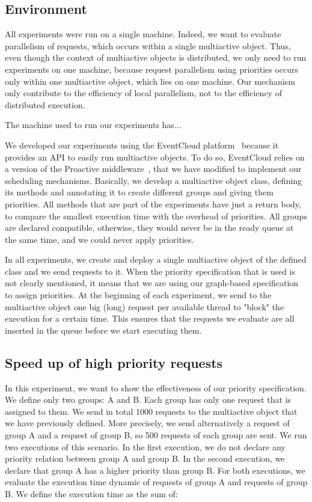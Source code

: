 \documentclass[11pt]{report}
\begin{document}
\subsection{Environment}
All experiments were run on a single machine. Indeed, we want to evaluate parallelism of requests, which occurs within a single multiactive object. Thus, even though the context of multiactive objects is distributed, we only need to run experiments on one machine, because request parallelism using priorities occurs only within one multiactive object, which lies on one machine. Our mechanism only contribute to the efficiency of local parallelism, not to the efficiency of distributed execution.

The machine used to run our experiments has...

We developed our experiments using the EventCloud platform~\citep{ref:eventcloud} because it provides an API to easily run multiactive objects. To do so, EventCloud relies on a version of the Proactive middleware~\citep{ref:proactive}, that we have modified to implement our scheduling mechanisms.
Basically, we develop a multiactive object class, defining its methods and annotating it to create different groups and giving them priorities. All methods that are part of the experiments have just a return body, to compare the smallest execution time with the overhead of priorities. All groups are declared compatible, otherwise, they would never be in the ready queue at the same time, and we could never apply priorities. 

In all experiments, we create and deploy a single multiactive object of the defined class and we send requests to it. When the priority specification that is used is not clearly mentioned, it means that we are using our graph-based specification to assign priorities. At the beginning of each experiment, we send to the multiactive object one big (long) request per available thread to "block" the execution for a certain time. This ensures that the requests we evaluate are all inserted in the queue before we start executing them.


\subsection{Speed up of high priority requests}
In this experiment, we want to show the effectiveness of our priority specification. We define only two groups: A and B. Each group has only one request that is assigned to them. We send in total 1000 requests to the multiactive object that we have previously defined. More precisely, we send alternatively a request of group A and a request of group B, so 500 requests of each group are sent. We run two executions of this scenario. In the first execution, we do not declare any priority relation between group A and group B. In the second execution, we declare that group A has a higher priority than group B. For both executions, we evaluate the execution time dynamic of requests of group A and requests of group B. We define the execution time as the sum of:
\end{document}
